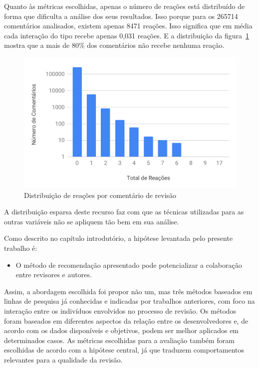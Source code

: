 \documentclass[12pt,openany,oneside,a4paper,english,brazil]{abntbibufjf}
\begin{document}
Quanto às métricas escolhidas, apenas o número de reações está distribuído de forma que dificulta a análise dos seus resultados. Isso porque para os 265714 comentários analisados, existem apenas 8471 reações. Isso significa que em média cada interação do tipo recebe apenas 0,031 reações. E a distribuição da figura~\ref{fig:dist-rc-reaction} mostra que a mais de 80\% dos comentários não recebe nenhuma reação.

\begin{figure}[!htbp]
 \includegraphics[width=\textwidth]{dist-rc-reaction}
 \caption{Distribuição de reações por comentário de revisão}\label{fig:dist-rc-reaction}
\end{figure}

A distribuição esparsa deste recurso faz com que as técnicas utilizadas para as outras variáveis não se apliquem tão bem em sua análise.

Como descrito no capítulo introdutório, a hipótese levantada pelo presente trabalho é:

\begin{itemize}
  \item O método de recomendação apresentado pode potencializar a colaboração entre revisores e autores.
\end{itemize}

Assim, a abordagem escolhida foi propor não um, mas três métodos baseados em linhas de pesquisa já conhecidas e indicadas por trabalhos anteriores, com foco na interação entre os indivíduos envolvidos no processo de revisão. Os métodos foram baseados em diferentes aspectos da relação entre os desenvolvedores e, de acordo com os dados disponíveis e objetivos, podem ser melhor aplicados em determinados casos. As métricas escolhidas para a avaliação também foram escolhidas de acordo com a hipótese central, já que traduzem comportamentos relevantes para a qualidade da revisão.
\end{document}
